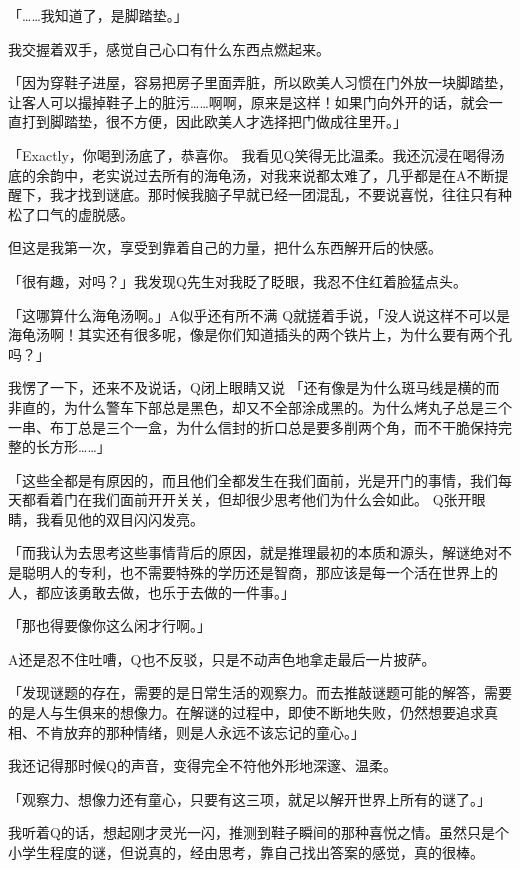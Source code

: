 \documentclass{article}
\begin{document}
「……我知道了，是脚踏垫。」 

我交握着双手，感觉自己心口有什么东西点燃起来。 

「因为穿鞋子进屋，容易把房子里面弄脏，所以欧美人习惯在门外放一块脚踏垫，让客人可以撮掉鞋子上的脏污……啊啊，原来是这样！如果门向外开的话，就会一直打到脚踏垫，很不方便，因此欧美人才选择把门做成往里开。」 

「Exactly，你喝到汤底了，恭喜你。
我看见Q笑得无比温柔。我还沉浸在喝得汤底的余韵中，老实说过去所有的海龟汤，对我来说都太难了，几乎都是在A不断提醒下，我才找到谜底。那时候我脑子早就已经一团混乱，不要说喜悦，往往只有种松了口气的虚脱感。 

但这是我第一次，享受到靠着自己的力量，把什么东西解开后的快感。 

\newpage

「很有趣，对吗？」我发现Q先生对我眨了眨眼，我忍不住红着脸猛点头。 

「这哪算什么海龟汤啊。」A似乎还有所不满
Q就搓着手说，「没人说这样不可以是海龟汤啊！其实还有很多呢，像是你们知道插头的两个铁片上，为什么要有两个孔吗？」 

我愣了一下，还来不及说话，Q闭上眼睛又说
「还有像是为什么斑马线是横的而非直的，为什么警车下部总是黑色，却又不全部涂成黑的。为什么烤丸子总是三个一串、布丁总是三个一盒，为什么信封的折口总是要多削两个角，而不干脆保持完整的长方形……」 

「这些全都是有原因的，而且他们全都发生在我们面前，光是开门的事情，我们每天都看着门在我们面前开开关关，但却很少思考他们为什么会如此。
Q张开眼睛，我看见他的双目闪闪发亮。 

「而我认为去思考这些事情背后的原因，就是推理最初的本质和源头，解谜绝对不是聪明人的专利，也不需要特殊的学历还是智商，那应该是每一个活在世界上的人，都应该勇敢去做，也乐于去做的一件事。」 

\newpage

「那也得要像你这么闲才行啊。」 

A还是忍不住吐嘈，Q也不反驳，只是不动声色地拿走最后一片披萨。 

「发现谜题的存在，需要的是日常生活的观察力。而去推敲谜题可能的解答，需要的是人与生俱来的想像力。在解谜的过程中，即使不断地失败，仍然想要追求真相、不肯放弃的那种情绪，则是人永远不该忘记的童心。」 

我还记得那时候Q的声音，变得完全不符他外形地深邃、温柔。 

「观察力、想像力还有童心，只要有这三项，就足以解开世界上所有的谜了。」 

我听着Q的话，想起刚才灵光一闪，推测到鞋子瞬间的那种喜悦之情。虽然只是个小学生程度的谜，但说真的，经由思考，靠自己找出答案的感觉，真的很棒。 
\end{document}
